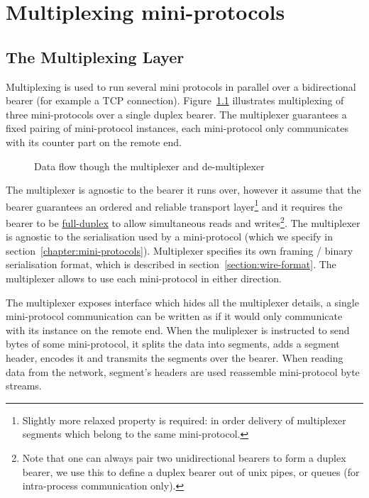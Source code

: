 \chapter{Multiplexing mini-protocols}
\label{chapter:multiplexer}

\section{The Multiplexing Layer}
\label{multiplexing-section}
Multiplexing is used to run several mini protocols in parallel over
a bidirectional bearer (for example a TCP connection).
Figure~\ref{mux-diagram} illustrates multiplexing of three mini-protocols over
a single duplex bearer.  The multiplexer guarantees a fixed pairing of
mini-protocol instances, each mini-protocol only communicates with its counter
part on the remote end.

\begin{figure}[ht]
\begin{center}
\end{center}
\caption{Data flow though the multiplexer and de-multiplexer}
\label{mux-diagram}
\end{figure}


The multiplexer is agnostic to the bearer it runs over, however it assume that
the bearer guarantees an ordered and reliable transport layer\footnote{Slightly
more relaxed property is required: in order delivery of multiplexer segments
which belong to the same mini-protocol.} and it requires the bearer to be
\href{https://www.wikiwand.com/en/Duplex_(telecommunications)\#/Full-duplex}{full-duplex}
to allow simultaneous reads and writes\footnote{Note that one can always pair
two unidirectional bearers to form a duplex bearer, we use this to define
a duplex bearer out of unix pipes, or queues (for intra-process communication
only).}.  The multiplexer is agnostic to the serialisation used by
a mini-protocol (which we specify in section~\ref{chapter:mini-protocols}).
Multiplexer specifies its own framing / binary serialisation format, which is
described in section~\ref{section:wire-format}.  The multiplexer allows to use
each mini-protocol in either direction.

The multiplexer exposes interface which hides all the multiplexer details,
a single mini-protocol communication can be written as if it would only
communicate with its instance on the remote end.  When the muliplexer is
instructed to send bytes of some mini-protocol, it splits the data into
segments, adds a segment header, encodes it and transmits the segments over the
bearer.  When reading data from the network, segment's headers are used
reassemble mini-protocol byte streams.

